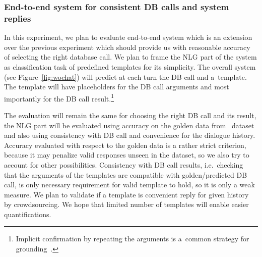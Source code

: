 \documentclass[11pt]{article}
\begin{document}
\subsubsection*{End-to-end system for consistent DB calls and system replies}
In this experiment, we plan to evaluate end-to-end system which is an extension over the previous experiment which should provide us with reasonable accuracy of selecting the right database call.
We plan to frame the NLG part of the system as classification task of predefined templates for its simplicity.
The overall system (see Figure~\ref{fig:wochat}) will predict at each turn the DB call and a~template.
The template will have placeholders for the DB call arguments and most importantly for the DB call result.\footnote{Implicit confirmation by repeating the arguments is a~common strategy for grounding~\cite{meena_crowdsourcing_2014}.}

The evaluation will remain the same for choosing the right DB call and its result, the NLG part will be evaluated using accuracy on the golden data from~\cite{platek2016wochat} dataset and also using consistency with DB call and convenience for the dialogue history.
Accuracy evaluated with respect to the golden data is a rather strict criterion, because it may penalize valid responses unseen in the dataset, so we also try to account for other possibilities.
Consistency with DB call results, i.e.\ checking that the arguments of the templates are compatible with golden/predicted DB call, is only necessary requirement for valid template to hold, so it is only a weak measure.
We plan to validate if a template is convenient reply for given history by crowdsourcing.
We hope that limited number of templates will enable easier quantifications.
\end{document}
